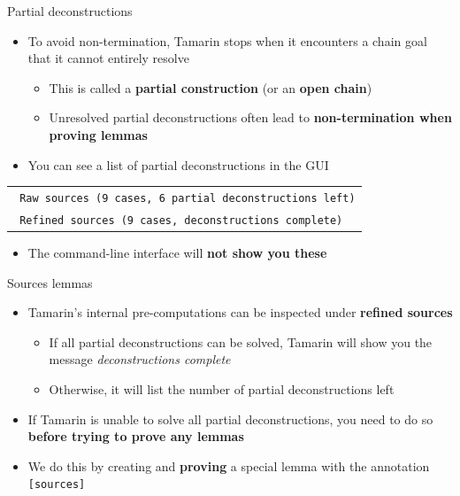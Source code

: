 \documentclass[11pt,aspectratio=169]{beamer}
\begin{document}
\begin{frame}[fragile]{Partial deconstructions}
    \begin{itemize}
        \item To avoid non-termination, Tamarin stops when it encounters a 
              chain goal that it cannot entirely resolve
        \begin{itemize}
            \item This is called a \textbf{partial construction}
                  (or an \textbf{open chain})
            \item Unresolved partial deconstructions often lead to
                  \textbf{non-termination when proving lemmas}
        \end{itemize}
        \item You can see a list of partial deconstructions in the GUI
    \end{itemize}
    \begin{center}
        \begin{tabular}{|l|}
            \hline
            \texttt{\textcolor[HTML]{2639B0}{
                Raw sources (9 cases, 6 partial deconstructions left)}}\\
            \texttt{\textcolor[HTML]{2639B0}{
                Refined sources (9 cases, deconstructions complete)}}\\
            \hline
        \end{tabular}
    \end{center}
    \begin{itemize}
        \item The command-line interface will \textbf{not show you these}
    \end{itemize}
\end{frame}

\begin{frame}[fragile]{Sources lemmas}
    \begin{itemize}
        \item Tamarin's internal pre-computations can be inspected under
              \textbf{refined sources}
        \begin{itemize}
            \item If all partial deconstructions can be solved, Tamarin will 
                  show you the message \textit{deconstructions complete}
            \item Otherwise, it will list the number of partial deconstructions 
                  left
        \end{itemize}
        \item If Tamarin is unable to solve all partial deconstructions, you 
              need to do so \textbf{before trying to prove any lemmas}
        \item We do this by creating and \textbf{proving} a special lemma with 
              the annotation \texttt{[sources]}
    \end{itemize}
\end{frame}
\end{document}
